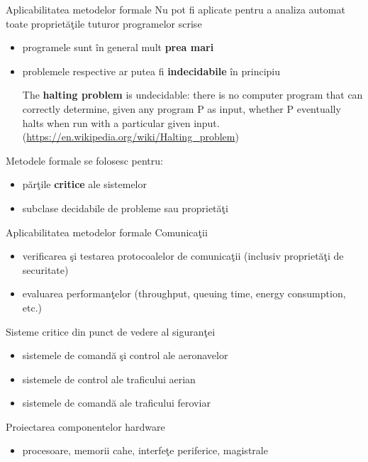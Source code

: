 \documentclass{beamer}
\begin{document}
\begin{frame}{Aplicabilitatea metodelor formale}
Nu pot fi aplicate pentru a analiza automat toate proprietăţile tuturor programelor scrise

\begin{itemize}
\item
programele sunt în general mult \textbf{prea mari}
\item
problemele respective ar putea fi \textbf{indecidabile} în principiu

The \textbf{halting problem} is undecidable: there is no computer program that can correctly determine, given any program P as input, whether P eventually halts when run with a particular given input. (\url{https://en.wikipedia.org/wiki/Halting_problem})
\end{itemize}

Metodele formale se folosesc pentru:

\begin{itemize}
\item
părţile \textbf{critice} ale sistemelor
\item
subclase decidabile de probleme sau proprietăţi
\end{itemize}

\end{frame}



\begin{frame}{Aplicabilitatea metodelor formale}
Comunicaţii
\begin{itemize}
\item
verificarea şi testarea protocoalelor de comunicaţii (inclusiv proprietăţi de securitate)
\item
evaluarea performanţelor (throughput, queuing time, energy consumption, etc.)
\end{itemize}

Sisteme critice din punct de vedere al siguranţei
\begin{itemize}
\item
sistemele de comandă şi control ale aeronavelor
\item
sistemele de control ale traficului aerian
\item
sistemele de comandă ale traficului feroviar
\end{itemize}

Proiectarea componentelor hardware
\begin{itemize}
\item
procesoare, memorii cahe, interfeţe periferice, magistrale
\end{itemize}
\end{frame}
\end{document}
